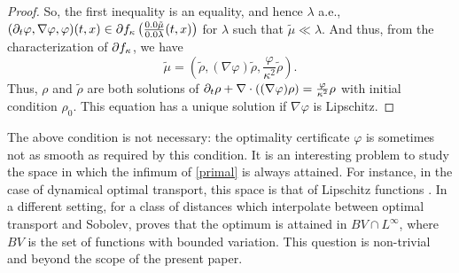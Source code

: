 \begin{proof}
So, the first inequality is an equality, and hence $\lambda$ a.e., $(\D_t \varphi, \nabla \varphi, \varphi)(t,x) \in \D \fonc \left( \frac{\d \tilde{\mu}}{\d \lambda} (t,x) \right)$ for $\lambda$ such that $\tilde{\mu}\ll \lambda$. And thus, from the characterization of $\partial f_{\kappa}$, we have 
\[
\tilde{\mu} = (\tilde{\rho}, (\nabla \varphi) \tilde{\rho}, \frac{\varphi}{\kappa^2}\tilde{\rho}).
\]
Thus, $\rho$ and $\tilde{\rho}$ are both solutions of $\partial_t \rho + \nabla \cdot ((\nabla \varphi) \rho) = \frac{\varphi}{\kappa^2} \rho$ with initial condition $\rho_0$. This equation has a unique solution if $\nabla \varphi$ is Lipschitz.
 \end{proof}

\begin{remark}[Relaxation]
The above condition is not necessary: the optimality certificate $\varphi$ is sometimes not as smooth as required by this condition. It is an interesting problem to study the space in which the infimum of \eqref{primal} is always attained. For instance, in the case of dynamical optimal transport, this space is that of Lipschitz functions \cite{jimenez2008dynamic}. In a different setting, for a class of distances which interpolate between optimal transport and Sobolev, \cite{Cardaliaguet:2012aa} proves that the optimum is attained in $BV \cap L^{\infty}$, where $BV$ is the set of functions with bounded variation. This question is non-trivial and beyond the scope of the present paper.
\end{remark}


